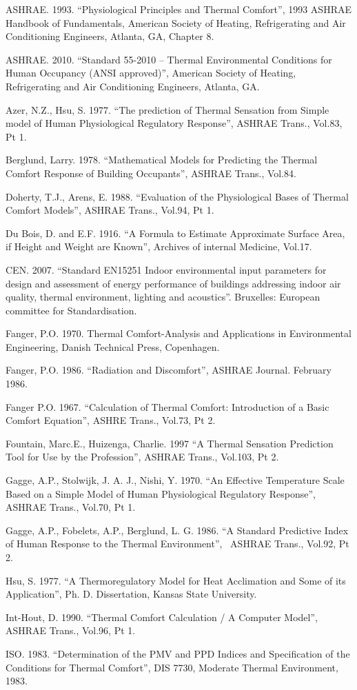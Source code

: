 ASHRAE. 1993. ``Physiological Principles and Thermal Comfort'', 1993 ASHRAE Handbook of Fundamentals, American Society of Heating, Refrigerating and Air Conditioning Engineers, Atlanta, GA, Chapter 8.

ASHRAE. 2010. ``Standard 55-2010 -- Thermal Environmental Conditions for Human Occupancy (ANSI approved)'', American Society of Heating, Refrigerating and Air Conditioning Engineers, Atlanta, GA.

Azer, N.Z., Hsu, S. 1977. ``The prediction of Thermal Sensation from Simple model of Human Physiological Regulatory Response'', ASHRAE Trans., Vol.83, Pt 1.

Berglund, Larry. 1978. ``Mathematical Models for Predicting the Thermal Comfort Response of Building Occupants'', ASHRAE Trans., Vol.84.

Doherty, T.J., Arens, E. 1988. ``Evaluation of the Physiological Bases of Thermal Comfort Models'', ASHRAE Trans., Vol.94, Pt 1.

Du Bois, D. and E.F. 1916. ``A Formula to Estimate Approximate Surface Area, if Height and Weight are Known'', Archives of internal Medicine, Vol.17.

CEN. 2007. ``Standard EN15251 Indoor environmental input parameters for design and assessment of energy performance of buildings addressing indoor air quality, thermal environment, lighting and acoustics''. Bruxelles: European committee for Standardisation.

Fanger, P.O. 1970. Thermal Comfort-Analysis and Applications in Environmental Engineering, Danish Technical Press, Copenhagen.

Fanger, P.O. 1986. ``Radiation and Discomfort'', ASHRAE Journal. February 1986.

Fanger P.O. 1967. ``Calculation of Thermal Comfort: Introduction of a Basic Comfort Equation'', ASHRE Trans., Vol.73, Pt 2.

Fountain, Marc.E., Huizenga, Charlie. 1997 ``A Thermal Sensation Prediction Tool for Use by the Profession'', ASHRAE Trans., Vol.103, Pt 2.

Gagge, A.P., Stolwijk, J. A. J., Nishi, Y. 1970. ``An Effective Temperature Scale Based on a Simple Model of Human Physiological Regulatory Response'', ASHRAE Trans., Vol.70, Pt 1.

Gagge, A.P., Fobelets, A.P., Berglund, L. G. 1986. ``A Standard Predictive Index of Human Response to the Thermal Environment'',~ ASHRAE Trans., Vol.92, Pt 2.

Hsu, S. 1977. ``A Thermoregulatory Model for Heat Acclimation and Some of its Application'', Ph. D. Dissertation, Kansas State University.

Int-Hout, D. 1990. ``Thermal Comfort Calculation / A Computer Model'', ASHRAE Trans., Vol.96, Pt 1.

ISO. 1983. ``Determination of the PMV and PPD Indices and Specification of the Conditions for Thermal Comfort'', DIS 7730, Moderate Thermal Environment, 1983.
